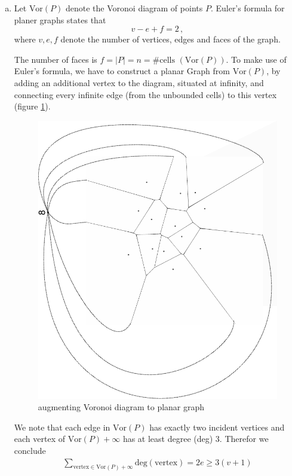 \documentclass[10pt,a4paper,boxed]{hmcpset}
\newcommand{\Vor}[1]{\textrm{Vor}(#1)}
\begin{document}
\begin{solution}
\begin{enumerate}[(a)]
				\item Let $\Vor{P}$ denote the Voronoi diagram of points $P$. Euler's formula for planer graphs states that
				\[ v - e + f = 2\,, \] where $v, e, f$ denote the number of vertices, edges and faces of the graph.
				
				The number of faces is $ f = \vert P \vert = n = \#\textrm{cells } (\Vor{P})$. To make use of Euler's formula, we have to construct a planar Graph from $ \Vor{P} $, by adding an additional vertex to the diagram, situated at infinity, and connecting every infinite edge (from the unbounded cells) to this vertex (figure \ref{fig:VorGraph}).
				
				\begin{figure}[h]
    			\centering
    			\includegraphics[scale=0.3]{1b.pdf} 
    			\caption{augmenting Voronoi diagram to planar graph}
    			\label{fig:VorGraph}
				\end{figure} 
				
				We note that each edge in $ \Vor{P} $ has exactly two incident vertices and each vertex of $ \Vor{P}+\infty $ has at least degree (\textrm{deg}) $ 3 $. Therefor we conclude
				\begin{align}
					\sum_{\textrm{vertex} \in \Vor{P}+\infty} \textrm{deg}(\textrm{vertex})  = 2e \geq 3 (v + 1) \label{eq:1}
				\end{align}
								

\end{enumerate}
\end{solution}
\end{document}
